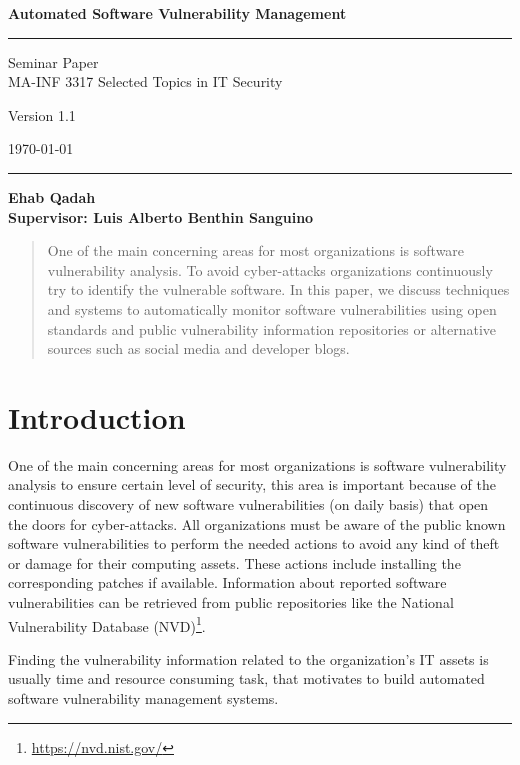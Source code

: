 \documentclass{llncs}
\begin{document}
\begin{flushleft}
 
 \thispagestyle{empty}
\centering\LARGE {\bf Automated Software Vulnerability Management}


\rule{\textwidth}{1pt}

\vspace{2pt}


\centering
 Seminar Paper  
 \\MA-INF 3317 Selected Topics in IT Security

{\Large Version 1.1 }

\vspace{8pt}
\today

\rule{\textwidth}{1pt}

\vspace{8 cm}

\centering
 \bf Ehab Qadah\\
 
 \vspace{7 pt}
\bf Supervisor: Luis Alberto Benthin Sanguino

\end{flushleft}


\newpage

\tableofcontents

\newpage


\begin{abstract}
One of the main concerning areas for most organizations is software vulnerability analysis. To avoid cyber-attacks organizations continuously try to identify the vulnerable software. In this paper, we discuss techniques and systems to automatically monitor software vulnerabilities using open standards and public vulnerability information repositories or alternative sources such as social media and developer blogs. 
\end{abstract}

\section{Introduction}

\par One of the main concerning areas for most organizations is software vulnerability analysis to ensure certain level of security, this area is important because of the continuous discovery of new software vulnerabilities (on daily basis) that open the doors for cyber-attacks. All organizations must be aware of the public known software vulnerabilities to perform the needed actions to avoid any kind of theft or damage for their computing assets. These actions include installing the corresponding patches if available. Information about reported software vulnerabilities can be retrieved from public repositories like the National Vulnerability Database (NVD)\footnote{\url{https://nvd.nist.gov/}}. 
\par Finding the vulnerability information related to the organization's IT assets is usually time and resource consuming task, that motivates to build automated software vulnerability management systems. 
 
\end{document}

